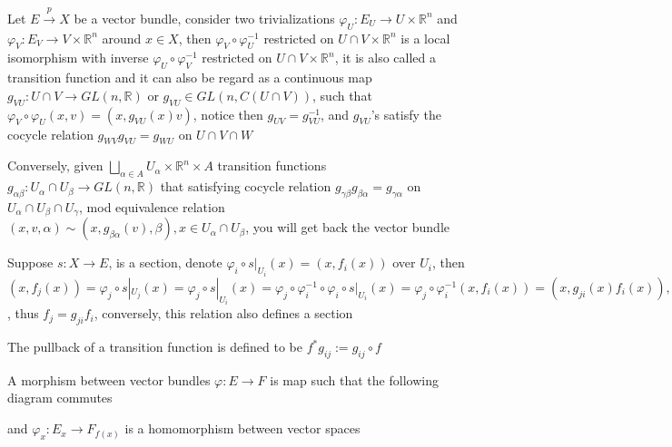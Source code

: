 \documentclass[main]{subfiles}
\begin{document}
\iffalse
\begin{definition}
Let $E\overset{p}{\rightarrow}X$ be a vector bundle, consider two trivializations $\varphi_U: E_U\to U\times\mathbb R^n$ and $\varphi_V: E_V\to V\times\mathbb R^n$ around $x\in X$, then $\varphi_V\circ\varphi_U^{-1}$ restricted on $U\cap V\times\mathbb R^n$ is a local isomorphism with inverse $\varphi_U\circ\varphi_V^{-1}$ restricted on $U\cap V\times\mathbb R^n$, it is also called a transition function and it can also be regard as a continuous map $g_{VU}: U\cap V\to GL(n,\mathbb R)$ or $g_{VU}\in GL(n,C(U\cap V))$, such that $\varphi_V\circ\varphi_U(x,v)=(x,g_{VU}(x)v)$, notice then $g_{UV}=g_{VU}^{-1}$, and $g_{VU}$'s satisfy the cocycle relation $g_{WV}g_{VU}=g_{WU}$ on $U\cap V\cap W$\par
Conversely, given $\displaystyle\bigsqcup_{\alpha\in A}U_\alpha\times\mathbb R^n\times A$ transition functions $g_{\alpha\beta}: U_\alpha\cap U_\beta \to GL(n,\mathbb R)$ that satisfying cocycle relation $g_{\gamma\beta}g_{\beta\alpha}=g_{\gamma\alpha}$ on $U_\alpha\cap U_\beta\cap U_\gamma$, mod equivalence relation $(x,v,\alpha)\sim(x,g_{\beta\alpha}(v),\beta),x\in U_\alpha\cap U_\beta$, you will get back the vector bundle \par
Suppose $s: X\to E$, is a section, denote $\varphi_i\circ s|_{U_i}(x)=(x,f_i(x))$ over $U_i$, then $(x,f_j(x))=\varphi_j\circ s|_{U_j}(x)=\varphi_j\circ s|_{U_i}(x)=\varphi_j\circ\varphi_i^{-1}\circ\varphi_i\circ s|_{U_i}(x)=\varphi_j\circ\varphi_i^{-1}(x,f_i(x))=(x,g_{ji}(x)f_i(x)), \forall x\in U_i\cap U_j$, thus $f_j=g_{ji}f_i$, conversely, this relation also defines a section
\end{definition}

\begin{definition}
The pullback of a transition function is defined to be $f^*g_{ij}:=g_{ij}\circ f$
\end{definition}

\begin{definition}
A morphism between vector bundles $\varphi:E\to F$ is map such that the following diagram commutes \par
\begin{center}
\end{center}
and $\varphi_x:E_x\to F_{f(x)}$ is a homomorphism between vector spaces
\end{definition}
\end{document}
